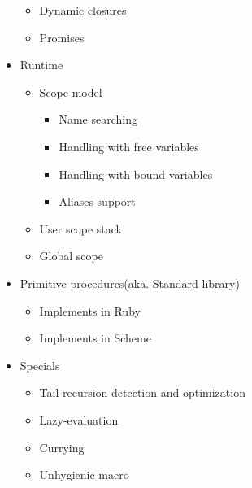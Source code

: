 \documentclass{article}
\begin{document}
\begin{itemize}
\begin{itemize}
  \item Dynamic closures
  \item Promises
  \end{itemize}

\item Runtime
  \begin{itemize}
  \item Scope model
    \begin{itemize}
    \item Name searching
    \item Handling with free variables
    \item Handling with bound variables
    \item Aliases support
    \end{itemize}
  \item User scope stack
  \item Global scope
  \end{itemize}

\item Primitive procedures(aka. Standard library)
  \begin{itemize}
  \item Implements in Ruby
  \item Implements in Scheme
  \end{itemize}

\item Specials
  \begin{itemize}
  \item Tail-recursion detection and optimization
  \item Lazy-evaluation
  \item Currying
  \item Unhygienic macro
  \end{itemize}
\end{itemize}
\end{document}
